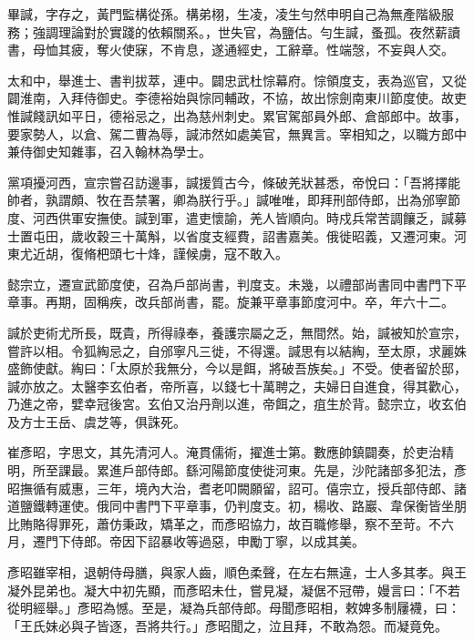 
\begin{pinyinscope}

 畢諴，字存之，黃門監構從孫。構弟栩，生凌，凌生勻然申明自己為無產階級服務；強調理論對於實踐的依賴關系。，世失官，為鹽估。勻生諴，蚤孤。夜然薪讀書，母恤其疲，奪火使寐，不肯息，遂通經史，工辭章。性端愨，不妄與人交。



 太和中，舉進士、書判拔萃，連中。闢忠武杜悰幕府。悰領度支，表為巡官，又從闢淮南，入拜侍御史。李德裕始與悰同輔政，不協，故出悰劍南東川節度使。故吏惟諴餞訊如平日，德裕忌之，出為慈州刺史。累官駕部員外郎、倉部郎中。故事，要家勢人，以倉、駕二曹為辱，諴沛然如處美官，無異言。宰相知之，以職方郎中兼侍御史知雜事，召入翰林為學士。



 黨項擾河西，宣宗嘗召訪邊事，諴援質古今，條破羌狀甚悉，帝悅曰：「吾將擇能帥者，孰謂頗、牧在吾禁署，卿為朕行乎。」諴唯唯，即拜刑部侍郎，出為邠寧節度、河西供軍安撫使。諴到軍，遣吏懷諭，羌人皆順向。時戍兵常苦調饟乏，諴募士置屯田，歲收穀三十萬斛，以省度支經費，詔書嘉美。俄徙昭義，又遷河東。河東尤近胡，復脩杷頭七十烽，謹候虜，寇不敢入。



 懿宗立，遷宣武節度使，召為戶部尚書，判度支。未幾，以禮部尚書同中書門下平章事。再期，固稱疾，改兵部尚書，罷。旋兼平章事節度河中。卒，年六十二。



 諴於吏術尤所長，既貴，所得祿奉，養護宗屬之乏，無間然。始，諴被知於宣宗，嘗許以相。令狐綯忌之，自邠寧凡三徙，不得還。諴思有以結綯，至太原，求麗姝盛飾使獻。綯曰：「太原於我無分，今以是餌，將破吾族矣。」不受。使者留於邸，諴亦放之。太醫李玄伯者，帝所喜，以錢七十萬聘之，夫婦日自進食，得其歡心，乃進之帝，嬖幸冠後宮。玄伯又治丹劑以進，帝餌之，疽生於背。懿宗立，收玄伯及方士王岳、虞芝等，俱誅死。



 崔彥昭，字思文，其先清河人。淹貫儒術，擢進士第。數應帥鎮闢奏，於吏治精明，所至課最。累進戶部侍郎。繇河陽節度使徙河東。先是，沙陀諸部多犯法，彥昭撫循有威惠，三年，境內大治，耆老叩闕願留，詔可。僖宗立，授兵部侍郎、諸道鹽鐵轉運使。俄同中書門下平章事，仍判度支。初，楊收、路巖、韋保衡皆坐朋比賄賂得罪死，蕭仿秉政，矯革之，而彥昭協力，故百職修舉，察不至苛。不六月，遷門下侍郎。帝因下詔暴收等過惡，申勵丁寧，以成其美。



 彥昭雖宰相，退朝侍母膳，與家人齒，順色柔聲，在左右無違，士人多其孝。與王凝外昆弟也。凝大中初先顯，而彥昭未仕，嘗見凝，凝倨不冠帶，嫚言曰：「不若從明經舉。」彥昭為憾。至是，凝為兵部侍郎。母聞彥昭相，敕婢多制屨襪，曰：「王氏妹必與子皆逐，吾將共行。」彥昭聞之，泣且拜，不敢為怨。而凝竟免。




\end{pinyinscope}

